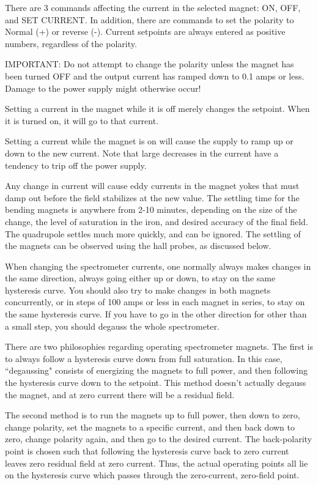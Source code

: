 There are 3 commands affecting the current in the selected magnet: ON, OFF,
and SET CURRENT. In addition, there are commands to set the polarity to
Normal (+) or reverse (-). Current setpoints are always entered as positive
numbers, regardless of the polarity.

IMPORTANT: Do not attempt to change the polarity unless the magnet has been
turned OFF and the output current has ramped down to 0.1 amps or less. Damage
to the power supply might otherwise occur!

Setting a current in the magnet while it is off merely changes the setpoint.
When it is turned on, it will go to that current.

Setting a current while the magnet is on will cause the supply to ramp up or
down to the new current. Note that large decreases in the current have a
tendency to trip off the power supply.

Any change in current will cause eddy currents in the magnet yokes that must
damp out before the field stabilizes at the new value. The settling time for the
bending magnets is anywhere from 2-10 minutes, depending on the size of the
change, the level of saturation in the iron, and desired accuracy of the final
field. The quadrupole settles much more quickly, and can be ignored. The
settling of the magnets can be observed using the hall probes, as discussed
below.

When changing the spectrometer currents, one normally always makes changes in
the same direction, always going either up or down, to stay on the same
hysteresis curve. You should also try to make changes in both magnets
concurrently, or in steps of 100 amps or less in each magnet in series, to stay
on the same hysteresis curve. If you have to go in the other direction for other
than a small step, you should degauss the whole spectrometer.

There are two philosophies regarding operating spectrometer magnets. The first
is to always follow a hysteresis curve down from full saturation. In this case,
``degaussing" consists of energizing the magnets to full power, and then
following the hysteresis curve down to the setpoint. This method doesn't
actually degauss the magnet, and at zero current there will be a residual field.

The second method is to run the magnets up to full power, then down to zero,
change polarity, set the magnets to a specific current, and then back down to
zero, change polarity again, and then go to the desired current. The
back-polarity point is chosen such that following the hysteresis curve back to
zero current leaves zero residual field at zero current. Thus, the actual
operating points all lie on the hysteresis curve which passes through the
zero-current, zero-field point.

